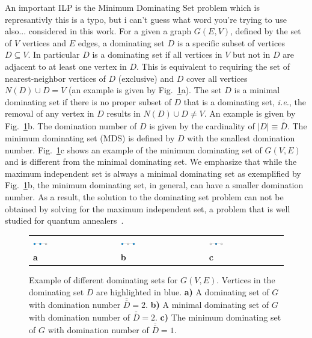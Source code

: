 \documentclass[prd,twocolumn,tightenlines,preprintnumbers,showpacs,superscriptaddress,notitlepage,nofootinbib,eqsecnum,floatfix,longbibliography,aps,10pt]{revtex4-2}
\begin{document}
An important ILP is the Minimum Dominating Set problem which is represantivly {\color{red} this is a typo, but i can't guess what word you're trying to use also...} considered in this work.
For a given a graph $G(E,V)$, defined by the set of $V$ vertices and $E$ edges, a dominating set $D$ is a specific subset of vertices $D \subseteq V$.
In particular $D$ is a dominating set if all vertices in $V$ but not in $D$ are adjacent to at least one vertex in $D$.
This is equivalent to requiring the set of nearest-neighbor vertices of $D$ (exclusive) and $D$ cover all vertices $N(D) \cup D = V$ (an example is given by Fig.~\ref{fig:dominating_sets}a).
The set $D$ is a minimal dominating set if there is no proper subset of $D$ that is a dominating set, {\it{i.e.}}, the removal of any vertex in $D$ results in $N(D) \cup D  \neq V$.
An example is given by Fig.~\ref{fig:dominating_sets}b.
The domination number of $D$ is given by the cardinality of $|D| \equiv \overline{\overline{D}}$.
The minimum dominating set (MDS) is defined by $D$ with the smallest domination number.
Fig.~\ref{fig:dominating_sets}c shows an example of the minimum dominating set of $G(V, E)$ and is different from the minimal dominating set.
We emphasize that while the maximum independent set is always a minimal dominating set as exemplified by Fig.~\ref{fig:dominating_sets}b, the minimum dominating set, in general, can have a smaller domination number.
As a result, the solution to the dominating set problem can not be obtained by solving for the maximum independent set, a problem that is well studied for quantum annealers~\cite{}.

\begin{figure}
	\centering
	\begin{tabular}{p{}p{}p{}p{}p{}}
	\includegraphics[width=0.2\textwidth]{./new_figures/MDS_mds0.pdf}
&&
	\includegraphics[width=0.2\textwidth]{./new_figures/MDS_mds1.pdf}
&&
	\includegraphics[width=0.2\textwidth]{./new_figures/MDS_mds2.pdf}\\
	\centering\bf{a} && \centering\bf{b} && \centering\bf{c}
	\end{tabular}
	\caption{Example of different dominating sets for $G(V, E)$. Vertices in the dominating set $D$ are highlighted in blue. {\bf{a)}} A dominating set of $G$ with domination number $\overline{\overline{D}} = 2$. {\bf{b)}} A minimal dominating set of $G$ with domination number of $\overline{\overline{D}} = 2$. {\bf{c)}} The minimum dominating set of $G$ with domination number of $\overline{\overline{D}} = 1$.}
	\label{fig:dominating_sets}
\end{figure}
\end{document}
